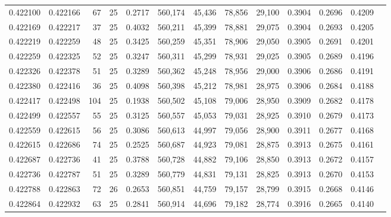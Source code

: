\begin{tabular}{rrrrrrrrrrrrr}
0.422100 & 0.422166 &    67 &  25 &                                     0.2717 & 560,174 &  45,436 &  78,856 &  29,100 & 0.3904 & 0.2696 & 0.4209 \\
0.422169 & 0.422217 &    37 &  25 &                                     0.4032 & 560,211 &  45,399 &  78,881 &  29,075 & 0.3904 & 0.2693 & 0.4205 \\
0.422219 & 0.422259 &    48 &  25 &                                     0.3425 & 560,259 &  45,351 &  78,906 &  29,050 & 0.3905 & 0.2691 & 0.4201 \\
0.422259 & 0.422325 &    52 &  25 &                                     0.3247 & 560,311 &  45,299 &  78,931 &  29,025 & 0.3905 & 0.2689 & 0.4196 \\
0.422326 & 0.422378 &    51 &  25 &                                     0.3289 & 560,362 &  45,248 &  78,956 &  29,000 & 0.3906 & 0.2686 & 0.4191 \\
0.422380 & 0.422416 &    36 &  25 &                                     0.4098 & 560,398 &  45,212 &  78,981 &  28,975 & 0.3906 & 0.2684 & 0.4188 \\
0.422417 & 0.422498 &   104 &  25 &                                     0.1938 & 560,502 &  45,108 &  79,006 &  28,950 & 0.3909 & 0.2682 & 0.4178 \\
0.422499 & 0.422557 &    55 &  25 &                                     0.3125 & 560,557 &  45,053 &  79,031 &  28,925 & 0.3910 & 0.2679 & 0.4173 \\
0.422559 & 0.422615 &    56 &  25 &                                     0.3086 & 560,613 &  44,997 &  79,056 &  28,900 & 0.3911 & 0.2677 & 0.4168 \\
0.422615 & 0.422686 &    74 &  25 &                                     0.2525 & 560,687 &  44,923 &  79,081 &  28,875 & 0.3913 & 0.2675 & 0.4161 \\
0.422687 & 0.422736 &    41 &  25 &                                     0.3788 & 560,728 &  44,882 &  79,106 &  28,850 & 0.3913 & 0.2672 & 0.4157 \\
0.422736 & 0.422787 &    51 &  25 &                                     0.3289 & 560,779 &  44,831 &  79,131 &  28,825 & 0.3913 & 0.2670 & 0.4153 \\
0.422788 & 0.422863 &    72 &  26 &                                     0.2653 & 560,851 &  44,759 &  79,157 &  28,799 & 0.3915 & 0.2668 & 0.4146 \\
0.422864 & 0.422932 &    63 &  25 &                                     0.2841 & 560,914 &  44,696 &  79,182 &  28,774 & 0.3916 & 0.2665 & 0.4140 \\

\end{tabular}
